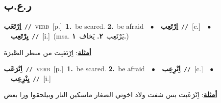 \documentclass[10pt,a4paper,twoside]{article} %
\begin{document}
\begin{multicols}{2}
\vspace{-3mm}
\subsection*{\color{blue}\foreignlanguage{arabic}{ر.ع.ب}\color{blue}{}} 

{\setlength\topsep{0pt}\textbf{\foreignlanguage{arabic}{اِرْتَعَب}}\ {\color{gray}\texttt{//}\color{black}}\ \textsc{verb}\ [p.]\ \textbf{1.}~be scared.  \textbf{2.}~be afraid\ \ $\bullet$\ \ \setlength\topsep{0pt}\textbf{\foreignlanguage{arabic}{اِرْتَعِب}}\ {\color{gray}\texttt{//}\color{black}}\ [c.]\ \ $\bullet$\ \ \setlength\topsep{0pt}\textbf{\foreignlanguage{arabic}{يِرْتَعِب}}\ {\color{gray}\texttt{//}\color{black}}\ [i.]\ \color{gray}(msa. \foreignlanguage{arabic}{يَرْتَعِب}~\foreignlanguage{arabic}{\textbf{٢.}}  \foreignlanguage{arabic}{يَخاف}~\foreignlanguage{arabic}{\textbf{١.}})\color{black}\  \begin{flushright}\color{gray}\foreignlanguage{arabic}{\textbf{\underline{\foreignlanguage{arabic}{أمثلة}}}: اِرْتَعَبِت من منظر الصَّبرَة}\end{flushright}\color{black}} \vspace{2mm}

{\setlength\topsep{0pt}\textbf{\foreignlanguage{arabic}{اِنْرَعَب}}\ {\color{gray}\texttt{//}\color{black}}\ \textsc{verb}\ [p.]\ \textbf{1.}~be scared.  \textbf{2.}~be afraid\ \ $\bullet$\ \ \setlength\topsep{0pt}\textbf{\foreignlanguage{arabic}{اِنْرِعِب}}\ {\color{gray}\texttt{//}\color{black}}\ [c.]\ \ $\bullet$\ \ \setlength\topsep{0pt}\textbf{\foreignlanguage{arabic}{يِنْرِعِب}}\ {\color{gray}\texttt{//}\color{black}}\ [i.]\  \begin{flushright}\color{gray}\foreignlanguage{arabic}{\textbf{\underline{\foreignlanguage{arabic}{أمثلة}}}: اِنْرَعَبت بس شفت ولاد اخوتي الصغار ماسكين النار وبيلحقوا ورا بعض}\end{flushright}\color{black}} \vspace{2mm}


\end{multicols}
\end{document}
